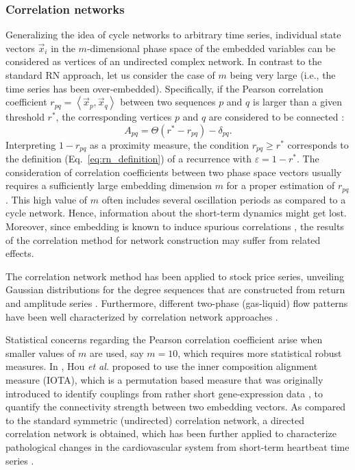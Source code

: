 		\subsubsection{Correlation networks}\label{sec:correlationnetworks}
		Generalizing the idea of cycle networks to arbitrary time series, individual state vectors $\vec{x}_i$ in the $m$-dimensional phase space of the embedded variables can be considered as vertices of an undirected complex network. In contrast to the standard RN approach, let us consider the case of $m$ being very large (i.e., the time series has been over-embedded). Specifically, if the Pearson correlation coefficient $r_{pq} = \left<\vec{x}_p,\vec{x}_q\right>$ between two sequences $p$ and $q$ is larger than a given threshold $r^*$, the corresponding vertices $p$ and $q$ are considered to be connected \cite{Yang2008,Gao2009}:
\begin{equation}
A_{pq}=\Theta(r^*-r_{pq})-\delta_{pq}.
\end{equation}
Interpreting $1-r_{pq}$ as a proximity measure, the condition $r_{pq}\geq r^*$ corresponds to the definition (Eq.~\ref{eq:rn_definition}) of a recurrence with $\varepsilon=1-r^*$. The consideration of correlation coefficients between two phase space vectors usually requires a sufficiently large embedding dimension $m$ for a proper estimation of $r_{pq}$. This high value of $m$ often includes several oscillation periods as compared to a cycle network. Hence, information about the short-term dynamics might get lost. Moreover, since embedding is known to induce spurious correlations \cite{thiel2006}, the results of the correlation method for network construction may suffer from related effects.

The correlation network method has been applied to stock price series, unveiling Gaussian distributions for the degree sequences that are constructed from return and amplitude series \cite{Yang2008}. Furthermore, different two-phase (gas-liquid) flow patterns have been well characterized by correlation network approaches \cite{Gao2009}.

		Statistical concerns regarding the Pearson correlation coefficient arise when smaller values of $m$ are used, say $m = 10$, which requires more statistical robust measures. In \cite{Hou2014}, Hou {\textit{et al.}} proposed to use the inner composition alignment measure (IOTA), which is a permutation based measure that was originally introduced to identify couplings from rather short gene-expression data \cite{Hempel2011}, to quantify the connectivity strength between two embedding vectors. As compared to the standard symmetric (undirected) correlation network, a directed correlation network is obtained, which has been further applied to characterize pathological changes in the cardiovascular system from short-term heartbeat time series \cite{Hou2014}.

